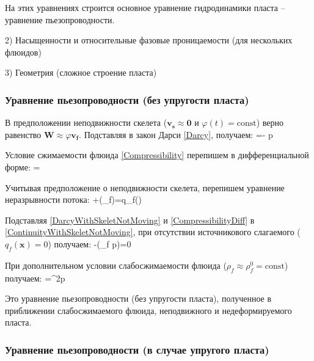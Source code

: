 \documentclass[main.tex]{subfiles}
\begin{document}
На этих уравнениях строится основное уравнение гидродинамики пласта -- уравнение пьезопроводности.

2) Насыщенности и относительные фазовые проницаемости (для нескольких флюидов)

3) Геометрия (сложное строение пласта)

\subsubsection{Уравнение пьезопроводности (без упругости пласта)}

В предположении неподвижности скелета ($\pmb{v_s}\approx \pmb{0}$ и $\varphi(t)=\textrm{const}$) верно равенство $\pmb{W}\approx\varphi \pmb{v_f}$. Подставляя в закон Дарси \eqref{Darcy}, получаем:
\beq\label{DarcyWithSkeletNotMoving}
\varphi {}=-\cdot\pmb{\nabla} p
\eeq

Условие сжимаемости флюида \eqref{Compressibility} перепишем в дифференциальной форме:
\beq\label{CompressibilityDiff}
=
\eeq

Учитывая предположение о неподвижности скелета, перепишем уравнение неразрывности потока:
\beq\label{ContinuityWithSkeletNotMoving}
\varphi{}+\pmb{\nabla}\cdot\left(\rho_f\varphi{}\right)=q_f()
\eeq

Подставляя \eqref{DarcyWithSkeletNotMoving} и \eqref{CompressibilityDiff} в \eqref{ContinuityWithSkeletNotMoving}, при отсутствии источникового слагаемого ($q_f(\pmb{x})=0$) получаем:
\beq
\varphi{}-\pmb{\nabla}\cdot\left(\rho_f\pmb{\nabla} p\right)=0
\eeq

При дополнительном условии слабосжимаемости флюида ($\rho_f\approx\rho_f^0=\textrm{const}$) получаем:
\beq
{}=\pmb{\nabla}^2p
\eeq

Это уравнение пьезопроводности (без упругости пласта), полученное в приближении слабосжимаемого флюида, неподвижного и недеформируемого пласта.

\subsubsection{Уравнение пьезопроводности (в случае упругого пласта)}
\end{document}

